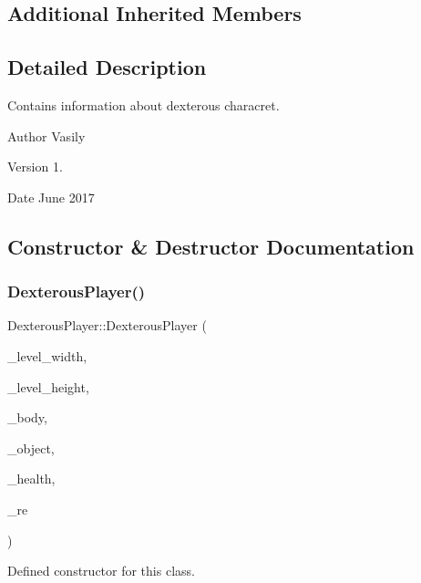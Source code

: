 \subsection*{Additional Inherited Members}


\subsection{Detailed Description}
Contains information about dexterous characret. 

\begin{DoxyAuthor}{Author}
Vasily 
\end{DoxyAuthor}
\begin{DoxyVersion}{Version}
1. 
\end{DoxyVersion}
\begin{DoxyDate}{Date}
June 2017 
\end{DoxyDate}


\subsection{Constructor \& Destructor Documentation}
\mbox{\label{class_dexterous_player_a852e50ce93cf01a9b042e58a6bcf2e4e}} 
\subsubsection{\texorpdfstring{Dexterous\+Player()}{DexterousPlayer()}}
{\footnotesize\ttfamily Dexterous\+Player\+::\+Dexterous\+Player (\begin{DoxyParamCaption}\item[{int}]{\+\_\+level\+\_\+width,  }\item[{int}]{\+\_\+level\+\_\+height,  }\item[{b2\+Body $\ast$}]{\+\_\+body,  }\item[{\hyperlink{class_object}{Object} $\ast$}]{\+\_\+object,  }\item[{int}]{\+\_\+health,  }\item[{\hyperlink{_events_8h_a51620cf702f1b8fdf47cd0a5cfa0ba4f}{Return\+Events} $\ast$}]{\+\_\+re }\end{DoxyParamCaption})}



Defined constructor for this class. 


